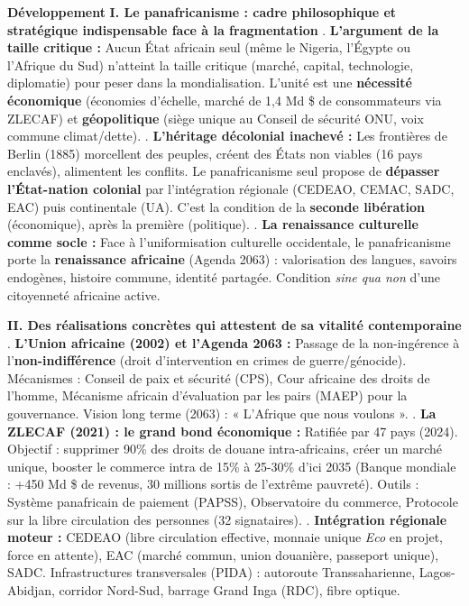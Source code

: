 \documentclass[11pt]{article}
\begin{document}
\begin{corrige}
\vspace{0,5cm}
\noindent\textbf{Développement}
\vspace{0,2cm}
\noindent\textbf{I. Le panafricanisme : cadre philosophique et stratégique indispensable face à la fragmentation}
\vspace{0,1cm}
. \textbf{L'argument de la taille critique :} Aucun État africain seul (même le Nigeria, l'Égypte ou l'Afrique du Sud) n'atteint la taille critique (marché, capital, technologie, diplomatie) pour peser dans la mondialisation. L'unité est une \textbf{nécessité économique} (économies d'échelle, marché de 1,4 Md \$ de consommateurs via ZLECAF) et \textbf{géopolitique} (siège unique au Conseil de sécurité ONU, voix commune climat/dette).
\vspace{0,1cm}
. \textbf{L'héritage décolonial inachevé :} Les frontières de Berlin (1885) morcellent des peuples, créent des États non viables (16 pays enclavés), alimentent les conflits. Le panafricanisme seul propose de \textbf{dépasser l'État-nation colonial} par l'intégration régionale (CEDEAO, CEMAC, SADC, EAC) puis continentale (UA). C'est la condition de la \textbf{seconde libération} (économique), après la première (politique).
\vspace{0,1cm}
. \textbf{La renaissance culturelle comme socle :} Face à l'uniformisation culturelle occidentale, le panafricanisme porte la \textbf{renaissance africaine} (Agenda 2063) : valorisation des langues, savoirs endogènes, histoire commune, identité partagée. Condition \emph{sine qua non} d'une citoyenneté africaine active.

\vspace{0,2cm}
\noindent\textbf{II. Des réalisations concrètes qui attestent de sa vitalité contemporaine}
\vspace{0,1cm}
. \textbf{L'Union africaine (2002) et l'Agenda 2063 :} Passage de la non-ingérence à l'\textbf{non-indifférence} (droit d'intervention en crimes de guerre/génocide). Mécanismes : Conseil de paix et sécurité (CPS), Cour africaine des droits de l'homme, Mécanisme africain d'évaluation par les pairs (MAEP) pour la gouvernance. Vision long terme (2063) : « L'Afrique que nous voulons ».
\vspace{0,1cm}
. \textbf{La ZLECAF (2021) : le grand bond économique :} Ratifiée par 47 pays (2024). Objectif : supprimer 90\% des droits de douane intra-africains, créer un marché unique, booster le commerce intra de 15\% à 25-30\% d'ici 2035 (Banque mondiale : +450 Md \$ de revenus, 30 millions sortis de l'extrême pauvreté). Outils : Système panafricain de paiement (PAPSS), Observatoire du commerce, Protocole sur la libre circulation des personnes (32 signataires).
\vspace{0,1cm}
. \textbf{Intégration régionale moteur :} CEDEAO (libre circulation effective, monnaie unique \emph{Eco} en projet, force en attente), EAC (marché commun, union douanière, passeport unique), SADC. Infrastructures transversales (PIDA) : autoroute Transsaharienne, Lagos-Abidjan, corridor Nord-Sud, barrage Grand Inga (RDC), fibre optique.


\end{corrige}
\end{document}
